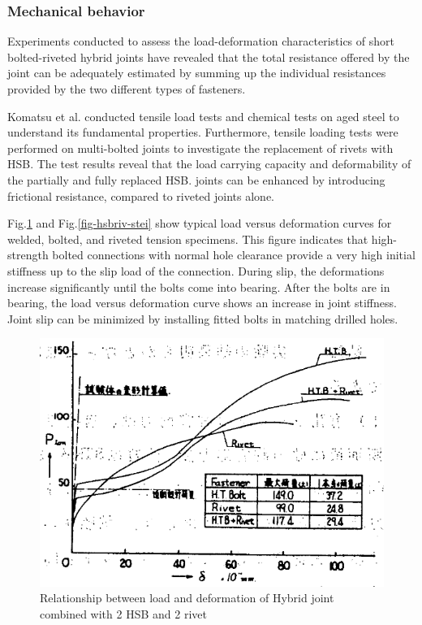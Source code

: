 \subsubsection{Mechanical behavior}

Experiments conducted to assess the load-deformation characteristics of short bolted-riveted hybrid joints have revealed that the total resistance offered by the joint can be adequately estimated by summing up the individual resistances provided by the two different types of fasteners.

Komatsu et al.\cite{KOMATSU2015} conducted tensile load tests and chemical tests on aged steel to understand its fundamental properties. Furthermore, tensile loading tests were performed on multi-bolted joints to investigate the replacement of rivets with HSB. The test results reveal that the load carrying capacity and deformability of the partially and fully replaced HSB. joints can be enhanced by introducing frictional resistance, compared to riveted joints alone.

Fig.\ref{fig-hsbriv-fune} \cite{funahashi1967Experimental} and Fig.\ref{fig-hsbriv-stei} \cite{steinhardt1969-hybrid} show typical load versus deformation curves for welded, bolted, and riveted tension specimens. This figure indicates that high-strength bolted connections with normal hole clearance provide a very high initial stiffness up to the slip load of the connection. During slip, the deformations increase significantly until the bolts come into bearing. After the bolts are in bearing, the load versus deformation curve shows an increase in joint stiffness. Joint slip can be minimized by installing fitted bolts in matching drilled holes.

\begin{figure}
    \centering
\includegraphics[width=0.75\linewidth]{imgs//ch2/hsbrivet-1967-pd.png}
    \caption{Relationship between load and deformation of Hybrid joint combined with 2 HSB and 2 rivet \cite{funahashi1967Experimental}}
    \label{fig-hsbriv-fune}
\end{figure}

